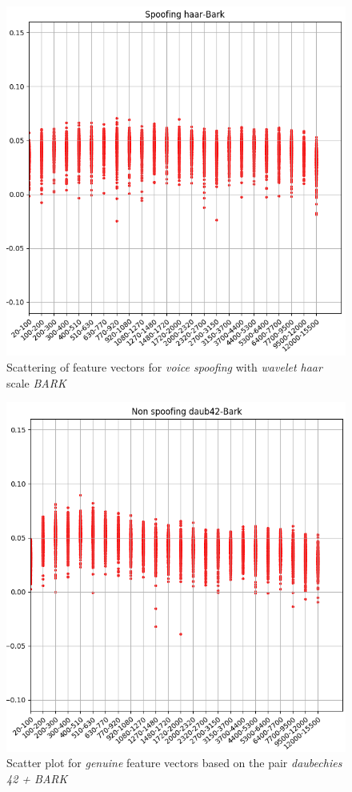 \begin{figure}[H]
\centering
\includegraphics[scale=.55]{images/results/barkVersusMel/spoofingHaarBark}
\caption{Scattering of feature vectors for \textit{voice spoofing} with \textit{wavelet haar} scale \textit{BARK}}
\label{fig:spoofinghaarbark}
\end{figure}
\begin{figure}[H]
\centering
\includegraphics[scale=.55]{images/results/barkVersusMel/liveDaub42Bark}
\caption{Scatter plot for \textit{genuine} feature vectors based on the pair \textit{daubechies 42 + BARK}}
\label{fig:livedaub42bark}
\end{figure}
